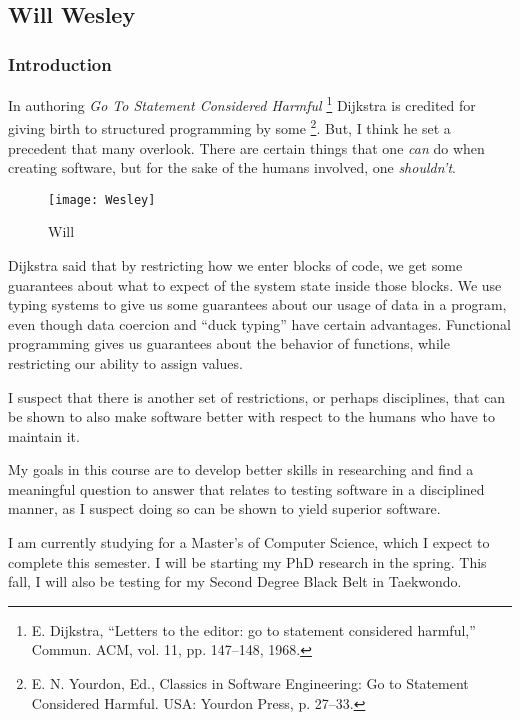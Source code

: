 \subsection{Will Wesley}
\subsubsection{Introduction}
In authoring \emph{Go To Statement Considered Harmful}
\footnote{E. Dijkstra, “Letters to the editor: go to statement considered harmful,” Commun. ACM, vol. 11, pp. 147–148, 1968.}
Dijkstra is credited for giving birth to structured programming by some
\footnote{E. N. Yourdon, Ed., Classics in Software Engineering: Go to Statement Considered Harmful.
USA: Yourdon Press, p. 27–33.}.
But, I think he set a precedent that many overlook.
There are certain things that one \emph{can} do when creating software, but for the sake of the humans involved, one \emph{shouldn't}.

\begin{wrapfigure}[13]{l}{0.3\linewidth}
  \texttt{[image: Wesley]}
  \caption{Will}
  \label{fig:will}
\end{wrapfigure}
Dijkstra said that by restricting how we enter blocks of code, we get some guarantees about what to expect of the system state inside those blocks.
We use typing systems to give us some guarantees about our usage of data in a program, even though data coercion and ``duck typing'' have certain advantages.
Functional programming gives us guarantees about the behavior of functions, while restricting our ability to assign values.

I suspect that there is another set of restrictions, or perhaps disciplines, that can be shown to also make software better with respect to the humans who have to maintain it.

My goals in this course are to develop better skills in researching and find a meaningful question to answer that relates to testing software in a disciplined manner, as I suspect doing so can be shown to yield superior software.

I am currently studying for a Master's of Computer Science, which I expect to complete this semester.
I will be starting my PhD research in the spring.
This fall, I will also be testing for my Second Degree Black Belt in Taekwondo.

